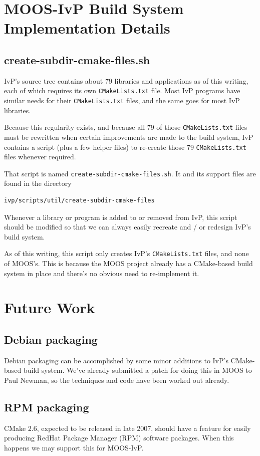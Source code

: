 \documentclass[letterpaper,10pt]{article}
\begin{document}
\section{MOOS-IvP Build System Implementation Details}

\subsection{create-subdir-cmake-files.sh}
IvP's source tree contains about 79 libraries and applications as of this writing, each of
which requires its own \verb|CMakeLists.txt| file.  Most IvP programs have similar needs
for their \verb|CMakeLists.txt| files, and the same goes for most IvP libraries.

Because this regularity exists, and because all 79 of those \verb|CMakeLists.txt| files must
be rewritten when certain improvements are made to the build system, IvP contains a
script (plus a few helper files) to re-create those 79 \verb|CMakeLists.txt| files 
whenever required.

That script is named \verb|create-subdir-cmake-files.sh|.  It and its support files are 
found in the directory
\begin{verbatim}
ivp/scripts/util/create-subdir-cmake-files 
\end{verbatim} 

Whenever a library or program is added to or removed from IvP, this script should be
modified so that we can always easily recreate and / or redesign IvP's build system.

As of this writing, this script only creates IvP's \verb|CMakeLists.txt| files, and none
of MOOS's.  This is because the MOOS project already has a CMake-based build system in 
place and there's no obvious need to re-implement it.


\section{Future Work}


\subsection{Debian packaging}
Debian packaging can be accomplished by some minor additions to IvP's 
CMake-based build system.  We've already submitted a patch for doing this
in MOOS to Paul Newman, so the techniques and code have been worked out
already.

\subsection{RPM packaging}
CMake 2.6, expected to be released in late 2007, should have a feature for
easily producing RedHat Package Manager (RPM) software packages.  When this
happens we may support this for MOOS-IvP.
\end{document}
